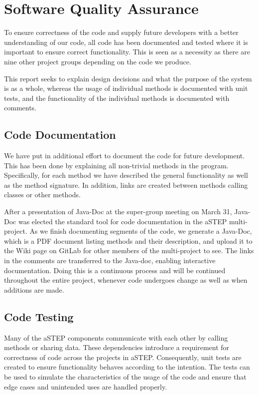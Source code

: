 \section{Software Quality Assurance}\label{sec:unit_test}
To ensure correctness of the code and supply future developers with a better understanding of our code, all code has been documented and tested where it is important to ensure correct functionality. This is seen as a necessity as there are nine other project groups depending on the code we produce.

This report seeks to explain design decisions and what the purpose of the system is as a whole, whereas the usage of individual methods is documented with unit tests, and the functionality of the individual methods is documented with comments.

\subsection{Code Documentation} \label{sec:code_documentation}
We have put in additional effort to document the code for future development. This has been done by explaining all non-trivial methods in the program. Specifically, for each method we have described the general functionality as well as the method signature. In addition, links are created between methods calling classes or other methods. 

After a presentation of Java-Doc at the super-group meeting on March 31, Java-Doc was elected the standard tool for code documentation in the aSTEP multi-project.
As we finish documenting segments of the code, we generate a Java-Doc, which is a PDF document listing methods and their description, and upload it to the Wiki page \cite{dokumentation_astep} on GitLab for other members of the multi-project to see. The links in the comments are transferred to the Java-doc, enabling interactive documentation. 
Doing this is a continuous process and will be continued throughout the entire project, whenever code undergoes change as well as when additions are made.

\subsection{Code Testing}\label{subsec:unit_testing}
Many of the aSTEP components communicate with each other by calling methods or sharing data. These dependencies introduce a requirement for correctness of code across the projects in aSTEP. Consequently, unit tests are created to ensure functionality behaves according to the intention. The tests can be used to simulate the characteristics of the usage of the code and ensure that edge cases and unintended uses are handled properly. 

